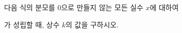 \hspace*{2mm}\begin{minipage}[t]{\dimexpr\linewidth-2mm\relax}\vspace{0pt}
다음 식의 분모를 $0$으로 만들지 않는 모든 실수 $x$에 대하여\par\smallskip{}\par\smallskip\noindent 가 성립할 때, 상수 $k$의 값을 구하시오.\end{minipage}
